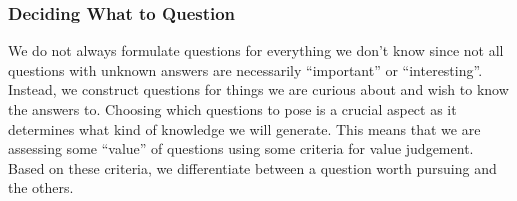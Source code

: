 

\subsubsection{Deciding What to Question}
We do not always formulate questions for everything we don't know since not all questions with unknown answers are necessarily ``important'' or ``interesting''. Instead, we construct questions for things we are curious about and wish to know the answers to. Choosing which questions to pose is a crucial aspect as it determines what kind of knowledge we will generate. This means that we are assessing some ``value'' of questions using some criteria for value judgement. Based on these criteria, we differentiate between a question worth pursuing and the others.


